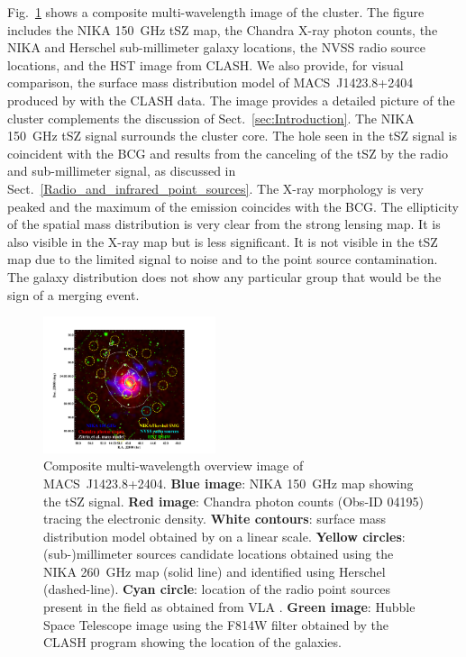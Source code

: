 \documentclass[twocolumn,traditabstract]{aa}
\begin{document}
Fig.~\ref{fig:MACSJ1424_mutiw} shows a composite multi-wavelength image of the cluster. The figure includes the NIKA 150~GHz tSZ map, the Chandra X-ray photon counts, the NIKA and Herschel sub-millimeter galaxy locations, the NVSS radio source locations, and the HST image from CLASH. We also provide, for visual comparison, the surface mass distribution model of \mbox{MACS~J1423.8+2404} produced by \cite{zitrin2011,zitrin2015} with the CLASH data. The image provides a detailed picture of the cluster complements the discussion of Sect.~\ref{sec:Introduction}. The NIKA 150~GHz  tSZ signal surrounds the cluster core. The hole seen in the tSZ signal is coincident with the BCG and results from the canceling of the tSZ by the radio and sub-millimeter signal, as discussed in Sect.~\ref{Radio_and_infrared_point_sources}. The X-ray morphology is very peaked and the maximum of the emission coincides with the BCG. The ellipticity of the spatial mass distribution is very clear from the strong lensing map. It is also visible in the X-ray map but is less significant. It is not visible in the tSZ map due to the limited signal to noise and to the point source contamination. The galaxy distribution does not show any particular group that would be the sign of a merging event.
\begin{figure}[]
\centering
\includegraphics[trim=1cm 0cm 5cm 2cm, clip=true, width=0.45\textwidth]{Figure/MACSJ1424_multicolor.pdf}
\caption{\footnotesize Composite multi-wavelength overview image of \mbox{MACS~J1423.8+2404}. {\bf Blue image}: NIKA 150~GHz map showing the tSZ signal. {\bf Red image}: Chandra photon counts (Obs-ID 04195) tracing the electronic density. {\bf White contours}: surface mass distribution model obtained by \cite{zitrin2011,zitrin2015} on a linear scale. {\bf Yellow circles}: (sub-)millimeter sources candidate locations obtained using the NIKA 260~GHz map (solid line) and identified using Herschel (dashed-line). {\bf Cyan circle}: location of the radio point sources present in the field as obtained from VLA \citep{laroque2003}. {\bf Green image}: Hubble Space Telescope image using the F814W filter obtained by the CLASH  program \citep{postman2012} showing the location of the galaxies.}
\label{fig:MACSJ1424_mutiw}
\end{figure}
\end{document}

